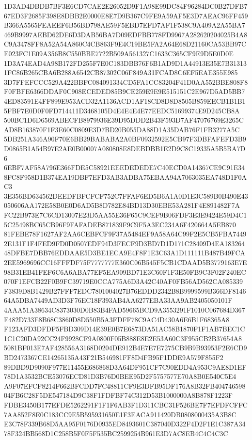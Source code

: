 \documentclass[UTF8,fontset=fandol,zihao=-4,a4paper]{ctexart}
\begin{document}
{{1D3AD4DBDB7BF3E6CD7CAE2E26052D9F1A98E99DC84F96284DC0B27DFB767ED3F2685F398E8DBB2E0000E8E7D9B367C9FE9A59AF5E3D7AEAC96FF459
B366A5565FEAEEF6B56BD798AE59F5EBD7EFD7AF1F538C9A409A2A55BA7469B9997AEBD62DE6D3DAB56BA7D09EDFBB778FD9967A282620204025B4A8
C9A3478FF8A52A54A860C4CB863F9E4C19BE5FA2A64E68D21160CA53BB97CE023FC1E09A356B8C550BBE7722B509A561327C1633C365CF9E9D5E0D0E
1D3A74EAD4A98B172FD255F7E0C183DBB76F6B1AD9D1A44913E35E7B313131FC86B265CBA6B288A6542CB87302C06F849A31FCAD8C6EF5EAE355E985
3D7FFEFCCC529A422BBFC084091334CD5FA1CC83204F41D0AA552BBE808F8F0FBFE6366DDAF0C908ECEDED85B9CE259E9E9E515151C2E967D5AD5BB7
4ED83591E4FF899E953ACD32A1136ACD1AF18CD8D8D8505B859EECB1B1B15FBF7E0D0F0FD714411D3468105D4E4E4E4E77EEDC51699374E9D245CB8A
500BC1D6D6569ABECFB8979936E39D95DDD2B43F593D7AF47076769E3265CAD8B163870F1F3E60C0809E3D7BD20B055DA88D1A35DAB76F1FB3277A5C
5DB251A346A90F70E6BB29BABABA2A0BF0932592E5CB97F3DBFAFEFD3B9D0865B1A54B97E2AE0B00007A080808E8DEBDBB1E2D9C8C19335A5B5BA7D6
6EBF7AF58A796E366FDE5C58921EEEDEDEDE7C40ECD0A14367CE9C91E348FC8F958D1B374EA19DBF7EFD3AB3ADBA75EBAA94A7063035EA748D1F0AC3
3E356BD634562DEEDFBFCFCF752C7FFAF6ED5B6A1A0D1E3C589B0B490E43050606AA172E58B0E0D6AD5B8D782E84BD13D30EBE53A281F4E891482F7A
FC22B973E7C6CD13007E23D5AA55E36F65C9CEF9B06FDF3E3E9424E59D4C15C25498BC65CB96F9FAFADEB871839F9C9F5A3EC234A6F420664A5EB870
81FEBE78F1627AF2AA6CEBFCF9F37A5484EF9A58A64C99F2E5CB5FBA74492E131F1F4FED9FD0D0507EDF94D3FECF9D3BD7D1D171C28409D4EA183264
48DFBE7DBB76EDDAAE5D3BE1ECA9E4F8F1E3C63A1D111111B487B49FCA2EE5969696CC16FFFDF75F7777777E360C06B545F5CB1CDAAD5B3779163E7E
98B31EB41FEF6C6A6ABA77EF5EA909BD71E3C60F1F3E50FB9C3F02F240EC070F1EFCB22F0B9FC39719E0CCA775A6D3A42C40AF0FB56AD562CA085339
F3839D8B1429B27FFF7EDC7801004027B76EDDD2342B8B9999599B366DF814664A5DBA7449AD3D3F76EC18F393AB4AA6277EBA33AA9AB2405050101F
4AAA51A38634C8373030D0B83B4FAD59665BCD9A3553291F1010C067684D367E482D733E8B68C3860D8D550B5A3FDFF78C9AC4D430A6E6B1F68365A8
F123AFD3DFDF5FBD309D14E39E0B7E6873DA51AC58B1870F1F1AB7BEC1C1C1C20DA92CC24F9928CF9A0800F05B888E8E2E53A60C3F955CB2B37654A8
5081BF013E7AF428556A3168D0204DE912B4E7E7E7275CB9B9B93953F2E6CD9BD2473367CE14265135A43F21B546981FF8D4FB95F1DDE9A579F855F2
89DBD9D9090F977E11455E686868D3A64DF951CF7C90EDD4A953C9AE8D1EF78D1A3532BCE53076ECD81D3B76D0BEE95D2F5757577E70A8B0E540C5E4
A9F07EFCF8214F662BFCDD7FC48811CF9E3DFB95DF176A8B32FB40474659804FB6C28F5DE547184D9C38F1FDFBF74C312D53B1000000A8B878F1223F
FDBE3450B177EFDE5262291F1F1F6AB3F1D311CBC31F526BE7F7EFDFCFFC7AA852F8E0C183CC9E5B595931650E1F3EACA911420DB0808000435A3B8C
E3C78F339B68D5AA95F0176D0935ED8493601C387040D322F4D2F1E1C387A3478F324BB568D1C258B5F0F5F535BC2599254B961E3D7AC8EB4C4C4C3C
}}
\end{document}
